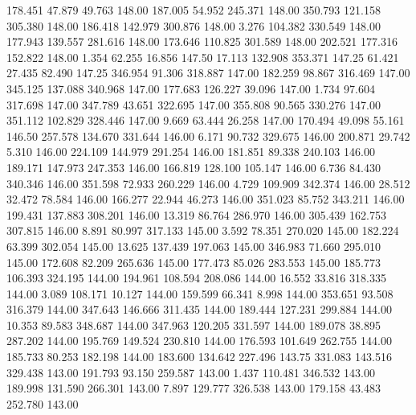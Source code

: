  178.451   47.879   49.763       148.00
 187.005   54.952  245.371       148.00
 350.793  121.158  305.380       148.00
 186.418  142.979  300.876       148.00
   3.276  104.382  330.549       148.00
 177.943  139.557  281.616       148.00
 173.646  110.825  301.589       148.00
 202.521  177.316  152.822       148.00
   1.354   62.255   16.856       147.50
  17.113  132.908  353.371       147.25
  61.421   27.435   82.490       147.25
 346.954   91.306  318.887       147.00
 182.259   98.867  316.469       147.00
 345.125  137.088  340.968       147.00
 177.683  126.227   39.096       147.00
   1.734   97.604  317.698       147.00
 347.789   43.651  322.695       147.00
 355.808   90.565  330.276       147.00
 351.112  102.829  328.446       147.00
   9.669   63.444   26.258       147.00
 170.494   49.098   55.161       146.50
 257.578  134.670  331.644       146.00
   6.171   90.732  329.675       146.00
 200.871   29.742    5.310       146.00
 224.109  144.979  291.254       146.00
 181.851   89.338  240.103       146.00
 189.171  147.973  247.353       146.00
 166.819  128.100  105.147       146.00
   6.736   84.430  340.346       146.00
 351.598   72.933  260.229       146.00
   4.729  109.909  342.374       146.00
  28.512   32.472   78.584       146.00
 166.277   22.944   46.273       146.00
 351.023   85.752  343.211       146.00
 199.431  137.883  308.201       146.00
  13.319   86.764  286.970       146.00
 305.439  162.753  307.815       146.00
   8.891   80.997  317.133       145.00
   3.592   78.351  270.020       145.00
 182.224   63.399  302.054       145.00
  13.625  137.439  197.063       145.00
 346.983   71.660  295.010       145.00
 172.608   82.209  265.636       145.00
 177.473   85.026  283.553       145.00
 185.773  106.393  324.195       144.00
 194.961  108.594  208.086       144.00
  16.552   33.816  318.335       144.00
   3.089  108.171   10.127       144.00
 159.599   66.341    8.998       144.00
 353.651   93.508  316.379       144.00
 347.643  146.666  311.435       144.00
 189.444  127.231  299.884       144.00
  10.353   89.583  348.687       144.00
 347.963  120.205  331.597       144.00
 189.078   38.895  287.202       144.00
 195.769  149.524  230.810       144.00
 176.593  101.649  262.755       144.00
 185.733   80.253  182.198       144.00
 183.600  134.642  227.496       143.75
 331.083  143.516  329.438       143.00
 191.793   93.150  259.587       143.00
   1.437  110.481  346.532       143.00
 189.998  131.590  266.301       143.00
   7.897  129.777  326.538       143.00
 179.158   43.483  252.780       143.00
